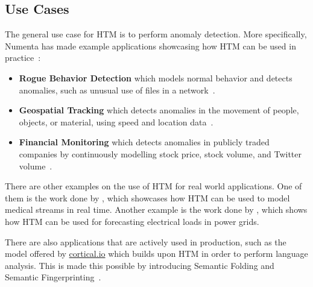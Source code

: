 \subsection{Use Cases}
The general use case for HTM is to perform anomaly detection. More specifically, Numenta has made example applications showcasing how HTM can be used in practice~\cite{numenta_example_apps}:
\begin{itemize}
    \item \textbf{Rogue Behavior Detection} which models normal behavior and detects anomalies, such as unusual use of files in a network~\cite{htm_rogue}.
    \item \textbf{Geospatial Tracking} which detects anomalies in the movement of people, objects, or material, using speed and location data~\cite{htm_geospatial}.
    \item \textbf{Financial Monitoring} which detects anomalies in publicly traded companies by continuously modelling stock price, stock volume, and Twitter volume~\cite{htm_finance}.
\end{itemize}
There are other examples on the use of HTM for real world applications. One of them is the work done by \textcite{htm_medicine}, which showcases how HTM can be used to model medical streams in real time. Another example is the work done by \textcite{htm_electrical_load}, which shows how HTM can be used for forecasting electrical loads in power grids.
\par
There are also applications that are actively used in production, such as the model offered by \href{www.cortical.io}{cortical.io} which builds upon HTM in order to perform language analysis. This is made this possible by introducing Semantic Folding and Semantic Fingerprinting~\cite{semantic_folding}.
